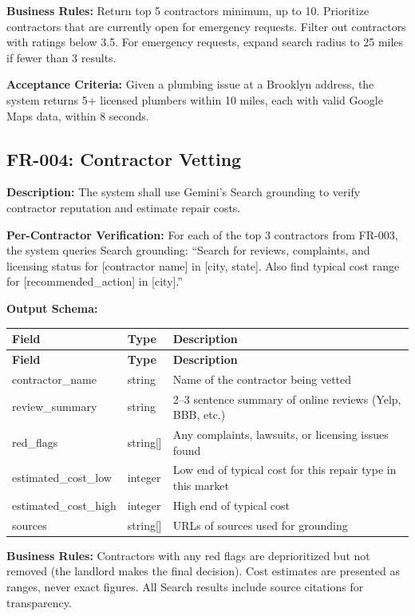 \documentclass[12pt,a4paper]{article}
\begin{document}
\textbf{Business Rules:} Return top 5 contractors minimum, up to 10. Prioritize contractors that are currently open for emergency requests. Filter out contractors with ratings below 3.5. For emergency requests, expand search radius to 25 miles if fewer than 3 results.

\textbf{Acceptance Criteria:} Given a plumbing issue at a Brooklyn address, the system returns 5+ licensed plumbers within 10 miles, each with valid Google Maps data, within 8 seconds.

\subsection{FR-004: Contractor Vetting}

\textbf{Description:} The system shall use Gemini's Search grounding to verify contractor reputation and estimate repair costs.

\textbf{Per-Contractor Verification:} For each of the top 3 contractors from FR-003, the system queries Search grounding: ``Search for reviews, complaints, and licensing status for [contractor name] in [city, state]. Also find typical cost range for [recommended\_action] in [city].''

\textbf{Output Schema:}

\begin{longtable}{L{3.5cm} L{2cm} L{8cm}}
\toprule
\textbf{Field} & \textbf{Type} & \textbf{Description} \\
\midrule
\endfirsthead
\toprule
\textbf{Field} & \textbf{Type} & \textbf{Description} \\
\midrule
\endhead
\bottomrule
\endfoot
contractor\_name & string & Name of the contractor being vetted \\
\midrule
review\_summary & string & 2--3 sentence summary of online reviews (Yelp, BBB, etc.) \\
\midrule
red\_flags & string[] & Any complaints, lawsuits, or licensing issues found \\
\midrule
estimated\_cost\_low & integer & Low end of typical cost for this repair type in this market \\
\midrule
estimated\_cost\_high & integer & High end of typical cost \\
\midrule
sources & string[] & URLs of sources used for grounding \\
\end{longtable}

\textbf{Business Rules:} Contractors with any red flags are deprioritized but not removed (the landlord makes the final decision). Cost estimates are presented as ranges, never exact figures. All Search results include source citations for transparency.
\end{document}
